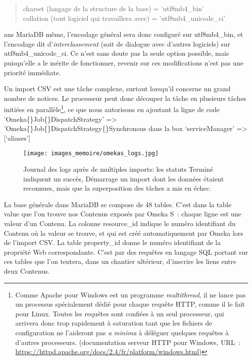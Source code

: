 \documentclass[a4paper,12pt, twoside]{book}
\begin{document}
\begin{quote}
    \textsf{\textcolor{graycode}{charset (langage de la structure de la base) = 'utf8mb4\_bin'\\
collation (tout logiciel qui travaillera avec) = 'utf8mb4\_unicode\_ci'\\}}
\end{quote}

ans MariaDB même, l’encodage général sera donc configuré sur \textsf{\textcolor{graycode}{utf8mb4\_bin}}, et l’encodage dit d’\textit{interclassement} (soit de dialogue avec d’autres logiciels) sur \textsf{\textcolor{graycode}{utf8mb4\_unicode\_ci}}. Ce n’est sans doute pas la seule option possible, mais puisqu’elle a le mérite de fonctionner, revenir sur ces modifications n’est pas une priorité immédiate.

Un import CSV est une tâche complexe, surtout lorsqu’il concerne un grand nombre de notices. Le processeur peut donc découper la tâche en plusieurs tâches initiées en parallèle\footnote{Comme Apache pour Windows est un programme \textit{multithread}, il ne lance pas un processus spécialement dédié pour chaque requête HTTP, comme il le fait pour Linux. Toutes les requêtes sont confiées à un seul processeur, qui arrivera donc trop rapidement à saturation tant que les fichiers de configuration ne l’aideront pas \textit{a minima} à déléguer quelques requêtes à d’autres processeurs. (documentation serveur HTTP pour Windows, URL~: \url{https://httpd.apache.org/docs/2.4/fr/platform/windows.html})}, ce que nous autorisons en ajoutant la ligne de code \textsf{\textcolor{graycode}{'Omeka\{\}Job\{\}DispatchStrategy' => 'Omeka\{\}Job\{\}DispatchStrategy\{\}Synchronous}} dans la box \textsf{\textcolor{graycode}{‘serviceManager’ => [‘aliases’]}}

\begin{figure}[!h]
    \centering
    \texttt{[image: images\_memoire/omekas\_logs.jpg]}
    \caption*{Journal des logs après de multiples imports: les statuts \textsf{Terminé} indiquent un succès, \textsf{Démarrage} un import dont les données étaient reconnues, mais que la superposition des tâches a mis en échec.}
    \label{Journal des logs après tentatives d'importation}
\end{figure}

La base générale dans MariaDB se compose de 48 tables. C’est dans la table \textsf{value} que l’on trouve nos \textsf{Contenus} exposés par Omeka S~: chaque ligne est une valeur d’un Contenu. La colonne \textsf{resource\_id} indique le numéro identifiant du Contenu où la valeur se trouve, et qui est créé automatiquement par Omeka lors de l’import CSV. La table \textsf{property\_id} donne le numéro identifiant de la propriété Web correspondante. C’est par des requêtes en langage SQL portant sur ces tables que l’on tentera, dans un chantier ultérieur, d’inscrire les liens entre deux Contenus.
\end{document}

